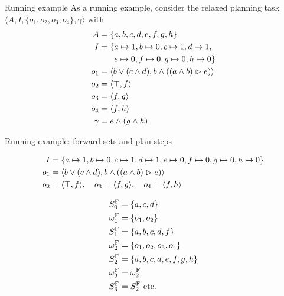 \documentclass{gkibeamer}
\begin{document}
\begin{frame}{Running example}
  As a running example, consider the relaxed planning task
  $\langle A, I, \{o_1, o_2, o_3, o_4\}, \gamma\rangle$ with
  \begin{align*}
    A ={} & \{a, b, c, d, e, f, g, h\} \\
    I ={} & \{a \mapsto 1, b \mapsto 0, c \mapsto 1,
      d \mapsto 1, \\
      & \phantom{\{}e \mapsto 0, f \mapsto 0, g \mapsto 0, h \mapsto
      0\} \\
    o_1 ={} &
    \langle b \lor (c \land d),
    b \land ((a \land b) \CEF e)\rangle \\
    o_2 ={} & \langle \top, f\rangle \\
    o_3 ={} & \langle f, g\rangle \\
    o_4 ={} & \langle f, h\rangle \\
    \gamma ={} & e \land (g \land h)
  \end{align*}
\end{frame}

\begin{frame}{Running example: forward sets and plan steps}
  \begin{small}
    \begin{align*}
      I & = \{a \mapsto 1, b \mapsto 0, c \mapsto 1, d \mapsto 1,
      e \mapsto 0, f \mapsto 0, g \mapsto 0, h \mapsto 0\} \\
      o_1 & = \langle b \lor (c \land d),
      b \land ((a \land b) \vartriangleright e)\rangle \\
      o_2 & = \langle \top, f\rangle, \quad
      o_3 = \langle f, g\rangle, \quad
      o_4 = \langle f, h\rangle
    \end{align*}
  \end{small}
  \vspace{-10pt}
  \begin{align*}
    S^{\text F}_0 & = \{a, c, d\} \\
    \omega^{\text F}_1 & = \{o_1, o_2\} \\
    S^{\text F}_1 & = \{a, b, c, d, f\} \\
    \omega^{\text F}_2 & = \{o_1, o_2,
    o_3, o_4\} \\
    S^{\text F}_2 & = \{a, b, c, d, e, f, g, h\} \\
    \omega^{\text F}_3 & = \omega^{\text F}_2 \\
    S^{\text F}_3 & = S^{\text F}_2 \text{~etc.}
  \end{align*}
\end{frame}
\end{document}
